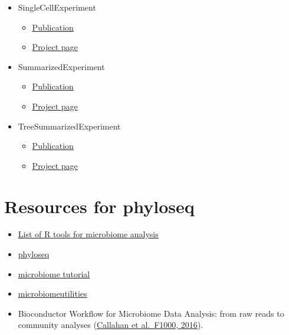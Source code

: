 \documentclass[
]{book}
\providecommand{\tightlist}{%
  \setlength{\itemsep}{0pt}\setlength{\parskip}{0pt}}
\begin{document}
\begin{itemize}
\tightlist
\item
  SingleCellExperiment

  \begin{itemize}
  \tightlist
  \item
    \href{https://bioconductor.org/packages/release/bioc/vignettes/SingleCellExperiment/inst/doc/intro.html}{Publication}
  \item
    \href{https://bioconductor.org/packages/release/bioc/html/SingleCellExperiment.html}{Project page}
  \end{itemize}
\item
  SummarizedExperiment

  \begin{itemize}
  \tightlist
  \item
    \href{https://bioconductor.org/packages/release/bioc/vignettes/SummarizedExperiment/inst/doc/SummarizedExperiment.html}{Publication}
  \item
    \href{https://bioconductor.org/packages/release/bioc/html/SummarizedExperiment.html}{Project page}
  \end{itemize}
\item
  TreeSummarizedExperiment

  \begin{itemize}
  \tightlist
  \item
    \href{https://f1000research.com/articles/9-1246}{Publication}
  \item
    \href{https://www.bioconductor.org/packages/release/bioc/html/TreeSummarizedExperiment.html}{Project page}
  \end{itemize}
\end{itemize}

\hypertarget{resources-for-phyloseq}{%
\section{Resources for phyloseq}\label{resources-for-phyloseq}}

\begin{itemize}
\tightlist
\item
  \href{https://microsud.github.io/Tools-Microbiome-Analysis/}{List of R tools for microbiome analysis}
\item
  \href{http://journals.plos.org/plosone/article?id=10.1371/journal.pone.0061217}{phyloseq}
\item
  \href{http://microbiome.github.io/tutorials/}{microbiome tutorial}
\item
  \href{https://microsud.github.io/microbiomeutilities/}{microbiomeutilities}
\item
  Bioconductor Workflow for Microbiome Data Analysis: from raw reads to community analyses (\href{https://f1000research.com/articles/5-1492/v2}{Callahan et al.~F1000, 2016}).
\end{itemize}
\end{document}
